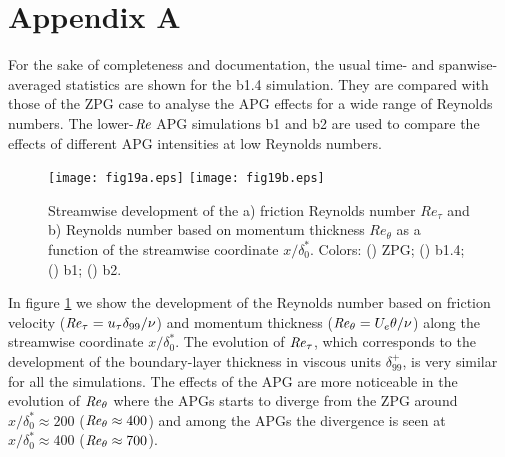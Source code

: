\section*{Appendix A} \label{sec:AppendixA}

 
For the sake of completeness and documentation, the usual time- and spanwise-averaged statistics are shown for the b1.4 simulation. They are compared with those of the ZPG case to analyse the APG effects for a wide range of Reynolds numbers. The lower-$\mbox{\textit{Re}}$ APG simulations b1 and b2 are used to compare the effects of different APG intensities at low Reynolds numbers.


\begin{figure}
\texttt{[image: fig19a.eps]}
\texttt{[image: fig19b.eps]}
  \caption{Streamwise development of the a) friction Reynolds number $Re_{\tau}$ and b) Reynolds number based on momentum thickness $Re_{\theta}$ as a function of the streamwise coordinate $x/\delta^{*}_{0}$.  Colors: (\protect\blackline) ZPG; (\protect\orangeline) b1.4; (\protect\redline) b1; (\protect\greenline) b2.}
\label{fig:RetauRetheta}
\end{figure}


In figure \ref{fig:RetauRetheta} we show the development of the Reynolds number based on friction velocity ($\mbox{\textit{Re}}_{\tau}=u_{\tau}\delta_{99}/\nu$) and momentum thickness ($\mbox{\textit{Re}}_{\theta}=U_{e} \theta / \nu$) along the streamwise coordinate $x/\delta_0^*$.
The evolution of $\mbox{\textit{Re}}_{\tau}$, which corresponds to the development of the boundary-layer thickness in viscous units $\delta_{99}^+$, is very similar for all the simulations. 
The effects of the APG are more noticeable in the evolution of $\mbox{\textit{Re}}_{\theta}$ where the APGs starts to diverge from the ZPG around $x/\delta_0^*\approx 200$ ($\mbox{\textit{Re}}_{\theta}\approx 400$) and among the APGs the divergence is seen at $x/\delta_0^*\approx 400$ ($\mbox{\textit{Re}}_{\theta}\approx 700$). 

